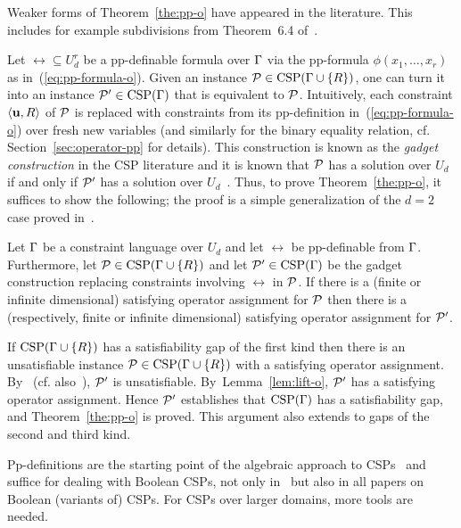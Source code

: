 \documentclass[11pt,letter]{article}
\begin{document}
Weaker forms of Theorem~\ref{the:pp-o} have appeared in the literature. This includes for example subdivisions from Theorem~6.4 of~\cite{Mastel24:stoc}.

Let $\rel\subseteq U_d^r$ be a pp-definable formula
over $\Gamma$ via the pp-formula $\phi(x_1,\ldots,x_r)$ as in~(\ref{eq:pp-formula-o}).
Given an instance
${\mathcal P}\in{\rm CSP}(\Gamma\cup\{R\})$, one can turn it into an instance
${\mathcal P}'\in{\rm CSP}(\Gamma)$ that is equivalent to ${\mathcal P}$. 
Intuitively, each constraint $\langle {\bf u},R \rangle$ of ${\mathcal P}$ is replaced with
constraints 
from its pp-definition in~(\ref{eq:pp-formula-o})
over fresh new variables (and similarly for the binary equality relation, cf. Section~\ref{sec:operator-pp} for details).
This construction is known as the \emph{gadget construction} in the CSP
literature and it is known that ${\mathcal P}$ has a solution over $U_d$
if and only if ${\mathcal P}'$ has a solution over $U_d$~\cite{Bulatov05:classifying,BKW17}.
Thus, to prove Theorem~\ref{the:pp-o}, it suffices to show the following;
the proof is a simple generalization of the $d=2$ case
proved in~\cite{AKS19:jcss}.

\begin{lemma}\label{lem:lift-o}
  Let $\Gamma$ be a constraint language over $U_d$ and let $\rel$ be pp-definable
  from $\Gamma$. Furthermore, let ${\mathcal P}\in{\rm CSP}(\Gamma\cup\{R\})$ and let
  ${\mathcal P}'\in{\rm CSP}(\Gamma)$ be the gadget construction replacing constraints involving
  $\rel$ in ${\mathcal P}$. If there is a (finite or infinite dimensional) satisfying operator assignment for ${\mathcal P}$ then there is a (respectively, finite or infinite dimensional) satisfying operator assignment for ${\mathcal P}'$. 
\end{lemma}

If ${\rm CSP}(\Gamma\cup\{R\})$ has a satisfiability gap of the first kind then there is
an unsatisfiable instance ${\mathcal P}\in{\rm CSP}(\Gamma\cup\{R\})$ with a satisfying
operator assignment. By~\cite{Bulatov05:classifying} (cf.
also~\cite{BKW17}), ${\mathcal P}'$ is unsatisfiable. By~Lemma~\ref{lem:lift-o}, ${\mathcal P}'$ has a satisfying operator assignment. 
Hence ${\mathcal P}'$ establishes that ${\rm CSP}(\Gamma)$ has a satisfiability gap, and
Theorem~\ref{the:pp-o} is proved. This argument also extends to gaps of the second and third kind.

\smallskip

Pp-definitions are the starting point of the algebraic approach to
CSPs~\cite{Bulatov05:classifying} and suffice for dealing with Boolean CSPs,
not only in~\cite{AKS19:jcss} but also in all papers on Boolean (variants of) CSPs. For
CSPs over larger domains, more tools are needed.
\end{document}
